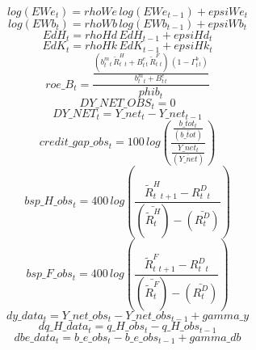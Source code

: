 \begin{dmath}
log\left({EWe_{t}}\right)={rhoWe}\, log\left({EWe_{t-1}}\right)+{epsiWe_{t}}
\end{dmath}
\begin{dmath}
log\left({EWb_{t}}\right)={rhoWb}\, log\left({EWb_{t-1}}\right)+{epsiWb_{t}}
\end{dmath}
\begin{dmath}
{EdH_{t}}={rhoHd}\, {EdH_{t-1}}+{epsiHd_{t}}
\end{dmath}
\begin{dmath}
{EdK_{t}}={rhoHk}\, {EdK_{t-1}}+{epsiHk_{t}}
\end{dmath}
\begin{dmath}
{roe\_B_{t}}=\frac{\frac{\left({ b^m_t _{t}}\, {  \tilde{R}^H_t _{t}}+{B^e_t_{t}}\, {  \tilde{R}^F_t _{t}}\right)\, \left(1-{ \Gamma^b_t _{t}}\right)}{{ b^m_t _{t}}+{B^e_t_{t}}}}{{phib_{t}}}
\end{dmath}
\begin{dmath}
{DY\_NET\_OBS_{t}}=0
\end{dmath}
\begin{dmath}
{DY\_NET_{t}}={Y\_net_{t}}-{Y\_net_{t-1}}
\end{dmath}
\begin{dmath}
{credit\_gap\_obs_{t}}=100\, log\left(\frac{\frac{{b\_tot_{t}}}{(\bar{b\_tot})}}{\frac{{Y\_net_{t}}}{(\bar{Y\_net})}}\right)
\end{dmath}
\begin{dmath}
{bsp\_H\_obs_{t}}=400\, log\left(\frac{{  \tilde{R}^H_t _{t+1}}-{  R^D_t _{t}}}{(\bar{  \tilde{R}^H_t })-(\bar{  R^D_t })}\right)
\end{dmath}
\begin{dmath}
{bsp\_F\_obs_{t}}=400\, log\left(\frac{{  \tilde{R}^F_t _{t+1}}-{  R^D_t _{t}}}{(\bar{  \tilde{R}^F_t })-(\bar{  R^D_t })}\right)
\end{dmath}
\begin{dmath}
{dy\_data_{t}}={Y\_net\_obs_{t}}-{Y\_net\_obs_{t-1}}+{gamma\_y}
\end{dmath}
\begin{dmath}
{dq\_H\_data_{t}}={q\_H\_obs_{t}}-{q\_H\_obs_{t-1}}
\end{dmath}
\begin{dmath}
{dbe\_data_{t}}={b\_e\_obs_{t}}-{b\_e\_obs_{t-1}}+{gamma\_db}
\end{dmath}
